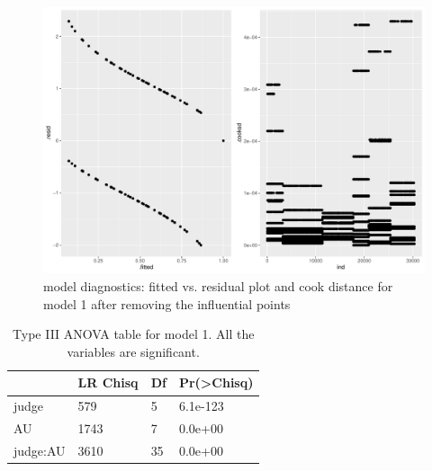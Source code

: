 \documentclass{monashthesis}
\begin{document}
\begin{figure}

{\centering \includegraphics[width=1\linewidth]{figures/mod1-diag-2-1} 

}

\caption{model diagnostics: fitted vs. residual plot and cook distance for model 1 after removing the influential points}\label{fig:mod1-diag-2}
\end{figure}

\begin{table}

\caption{\label{tab:anova-1}\label{tab:anova-1}Type III ANOVA table for model 1. All the variables are significant.}
\centering
\begin{tabular}[t]{l|l|l|l}
\hline
  & LR Chisq & Df & Pr(>Chisq)\\
\hline
judge & 579 & 5 & 6.1e-123\\
\hline
AU & 1743 & 7 & 0.0e+00\\
\hline
judge:AU & 3610 & 35 & 0.0e+00\\
\hline
\end{tabular}
\end{table}
\end{document}
